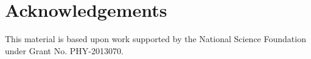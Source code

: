 \documentclass[12pt, a4paper]{article}
\begin{document}




\clearpage

\section*{Acknowledgements}

This material is based upon work supported by the National Science Foundation under Grant No. PHY-2013070.







%

\end{document}
